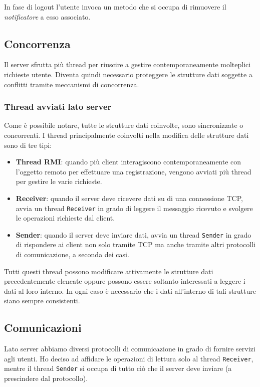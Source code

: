In fase di logout l'utente invoca un metodo che si occupa di rimuovere il \emph{notificatore}
a esso associato.

\subsection{Concorrenza}
Il server sfrutta più thread per riuscire a gestire contemporaneamente molteplici richieste utente.
Diventa quindi necessario proteggere le strutture dati soggette a conflitti tramite meccanismi di
concorrenza.

\subsubsection{Thread avviati lato server}
Come è possibile notare, tutte le strutture dati coinvolte, sono sincronizzate o concorrenti. I
thread principalmente coinvolti nella modifica delle strutture dati sono di tre tipi:
\begin{itemize}
	\item \textbf{Thread RMI}: quando più client interagiscono contemporaneamente con l'oggetto
	      remoto per effettuare una registrazione, vengono avviati più thread per gestire le varie
	      richieste.
	\item \textbf{Receiver}: quando il server deve ricevere dati su di una connessione TCP,
	      avvia un thread \verb|Receiver| in grado di leggere il messaggio ricevuto e svolgere le
	      operazioni richieste dal client.
	\item \textbf{Sender}: quando il server deve inviare dati, avvia un thread \verb|Sender| in
	      grado di rispondere ai client non solo tramite TCP ma anche tramite altri protocolli di
	      comunicazione, a seconda dei casi.
\end{itemize}
Tutti questi thread possono modificare attivamente le strutture dati precedentemente elencate
oppure possono essere soltanto interessati a leggere i dati al loro interno. In ogni caso è
necessario che i dati all'interno di tali strutture siano sempre consistenti.

\subsection{Comunicazioni}
Lato server abbiamo diversi protocolli di comunicazione in grado di fornire servizi agli utenti.
Ho deciso ad affidare le operazioni di lettura solo al thread \verb|Receiver|, mentre il thread
\verb|Sender| si occupa di tutto ciò che il server deve inviare (a prescindere dal protocollo).

